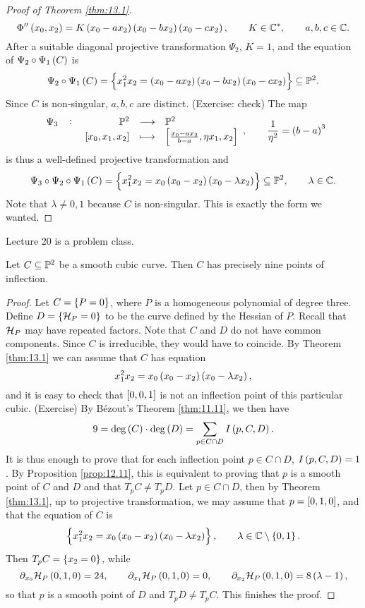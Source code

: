 \begin{proof}[Proof of Theorem \ref{thm:13.1}]
$$ \Phi''\br{x_0, x_2} = K\br{x_0 - ax_2}\br{x_0 - bx_2}\br{x_0 - cx_2}, \qquad K \in \C^*, \qquad a, b, c \in \C. $$
After a suitable diagonal projective transformation $ \Psi_2 $, $ K = 1 $, and the equation of $ \Psi_2 \circ \Psi_1\br{C} $ is
$$ \Psi_2 \circ \Psi_1\br{C} = \cbr{x_1^2x_2 = \br{x_0 - ax_2}\br{x_0 - bx_2}\br{x_0 - cx_2}} \subseteq \P^2. $$
Since $ C $ is non-singular, $ a, b, c $ are distinct. (Exercise: check) The map
$$ \function[\Psi_3]{\P^2}{\P^2}{\sbr{x_0, x_1, x_2}}{\sbr{\tfrac{x_0 - ax_2}{b - a}, \eta x_1, x_2}}, \qquad \dfrac{1}{\eta^2} = \br{b - a}^3 $$
is thus a well-defined projective transformation and
$$ \Psi_3 \circ \Psi_2 \circ \Psi_1\br{C} = \cbr{x_1^2x_2 = x_0\br{x_0 - x_2}\br{x_0 - \lambda x_2}} \subseteq \P^2, \qquad \lambda \in \C. $$
Note that $ \lambda \ne 0, 1 $ because $ C $ is non-singular. This is exactly the form we wanted.
\end{proof}


Lecture 20 is a problem class.


\begin{corollary}
Let $ C \subseteq \P^2 $ be a smooth cubic curve. Then $ C $ has precisely nine points of inflection.
\end{corollary}

\begin{proof}
Let $ C = \cbr{P = 0} $, where $ P $ is a homogeneous polynomial of degree three. Define $ D = \cbr{\HH_P = 0} $ to be the curve defined by the Hessian of $ P $. Recall that $ \HH_P $ may have repeated factors. Note that $ C $ and $ D $ do not have common components. Since $ C $ is irreducible, they would have to coincide. By Theorem \ref{thm:13.1} we can assume that $ C $ has equation
$$ x_1^2x_2 = x_0\br{x_0 - x_2}\br{x_0 - \lambda x_2}, $$
and it is easy to check that $ \sbr{0, 0, 1} $ is not an inflection point of this particular cubic. (Exercise) By B\'ezout's Theorem \ref{thm:11.11}, we then have
$$ 9 = \deg\br{C} \cdot \deg\br{D} = \sum_{p \in C \cap D} I\br{p, C, D}. $$
It is thus enough to prove that for each inflection point $ p \in C \cap D $, $ I\br{p, C, D} = 1 $. By Proposition \ref{prop:12.11}, this is equivalent to proving that $ p $ is a smooth point of $ C $ and $ D $ and that $ T_pC \ne T_pD $. Let $ p \in C \cap D $, then by Theorem \ref{thm:13.1}, up to projective transformation, we may assume that $ p = \sbr{0, 1, 0} $, and that the equation of $ C $ is
$$ \cbr{x_1^2x_2 = x_0\br{x_0 - x_2}\br{x_0 - \lambda x_2}}, \qquad \lambda \in \C \setminus \cbr{0, 1}. $$
Then $ T_pC = \cbr{x_2 = 0} $, while
$$ \partial_{x_0}\HH_P\br{0, 1, 0} = 24, \qquad \partial_{x_1}\HH_P\br{0, 1, 0} = 0, \qquad \partial_{x_2}\HH_P\br{0, 1, 0} = 8\br{\lambda - 1}, $$
so that $ p $ is a smooth point of $ D $ and $ T_pD \ne T_pC $. This finishes the proof.
\end{proof}

